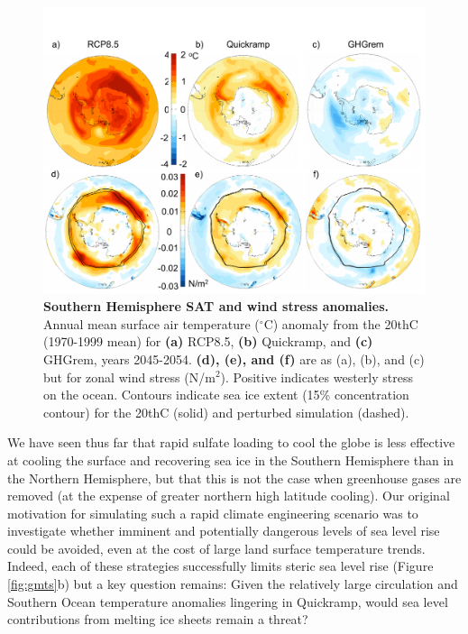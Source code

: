 \documentclass[grl]{AGUTeX}  %
\begin{document}
\begin{article}
\begin{figure}[htbp] %
\centering
 \noindent\includegraphics[width=30pc]{figures/SHmaps3.pdf}
\caption{\textbf{Southern Hemisphere SAT and wind stress anomalies.} Annual mean surface air temperature ($^\circ$C) anomaly from the 20thC (1970-1999 mean) for \textbf{(a)} RCP8.5, \textbf{(b)} Quickramp, and \textbf{(c)} GHGrem, years 2045-2054. \textbf{(d), (e), and (f)} are as (a), (b), and (c) but for zonal wind stress (N/m$^2$). Positive indicates westerly stress on the ocean. Contours indicate sea ice extent (15\% concentration contour) for the 20thC (solid) and perturbed simulation (dashed).}
\label{fig:shmaps}
\end{figure}

We have seen thus far that rapid sulfate loading to cool the globe is less effective at cooling the surface and recovering sea ice in the Southern Hemisphere than in the Northern Hemisphere, but that this is not the case when greenhouse gases are removed (at the expense of greater northern high latitude cooling). Our original motivation for simulating such a rapid climate engineering scenario was to investigate whether imminent and potentially dangerous levels of sea level rise could be avoided, even at the cost of large land surface temperature trends. Indeed, each of these strategies successfully limits steric sea level rise (Figure \ref{fig:gmts}b) but a key question remains: Given the relatively large circulation and Southern Ocean temperature anomalies lingering in Quickramp, would sea level contributions from melting ice sheets remain a threat? %


\end{article}
\end{document}
